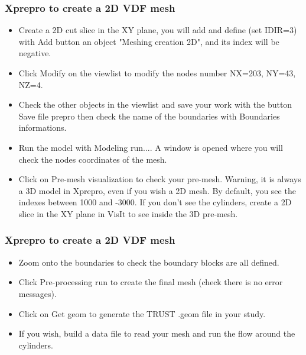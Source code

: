 \documentclass[10pt]{beamer}
\begin{document}
\begin{frame}
\frametitle{Xprepro to create a 2D VDF mesh}
\begin{block}{}

\begin{itemize}
\item Create a 2D cut slice in the XY plane, you will add and define (set IDIR=3) with Add button an object "Meshing creation 2D", and its index will be negative.

\item Click Modify on the viewlist to modify the nodes number NX=203, NY=43, NZ=4.

\item Check the other objects in the viewlist and save your work with the button Save file prepro then check the name of the boundaries with Boundaries informations.

\item Run the model with Modeling run.... A window is opened where you will check the nodes coordinates of the mesh.

\item Click on Pre-mesh visualization to check your pre-mesh. Warning, it is always a 3D model in Xprepro, even if you wish a 2D mesh. By default, you see the indexes between 1000 and -3000. If you don't see the cylinders, create a 2D slice in the XY plane in VisIt to see inside the 3D pre-mesh.
\end{itemize}

\end{block}
\end{frame}
\begin{frame}
\frametitle{Xprepro to create a 2D VDF mesh}
\begin{block}{}

\begin{itemize}
\item Zoom onto the boundaries to check the boundary blocks are all defined.

\item Click Pre-processing run to create the final mesh (check there is no error messages).

\item Click on Get geom to generate the TRUST .geom file in your study.

\item If you wish, build a data file to read your mesh and run the flow around the cylinders.
\end{itemize}

\end{block}
\end{frame}
\end{document}
